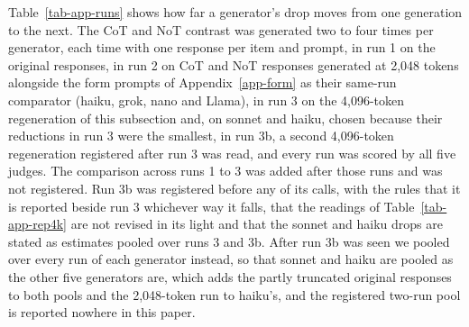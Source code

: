 Table~\ref{tab-app-runs} shows how far a generator's drop moves from one
generation to the next. The CoT and NoT contrast was generated two to four
times per generator, each time with one response per item and prompt, in run
1 on the original responses, in run 2 on CoT and NoT responses generated at
2,048 tokens alongside the form prompts of Appendix~\ref{app-form} as their
same-run comparator (haiku, grok, nano and Llama), in run 3 on the
4,096-token regeneration of this subsection and, on sonnet and haiku, chosen
because their reductions in run 3 were the smallest, in run 3b, a second
4,096-token regeneration registered after run 3 was read, and every run was
scored by all five judges.
The comparison across runs 1 to 3 was added after those runs and was not
registered. Run 3b was registered before any of its calls, with the rules
that it is reported beside run 3 whichever way it falls, that the readings
of Table~\ref{tab-app-rep4k} are not revised in its light and that the sonnet
and haiku drops are stated as estimates pooled over runs 3 and 3b. After run
3b was seen we pooled over every run of each generator instead, so that
sonnet and haiku are pooled as the other five generators are, which adds the
partly truncated original responses to both pools and the 2,048-token run to
haiku's, and the registered two-run pool is reported nowhere in this paper.
